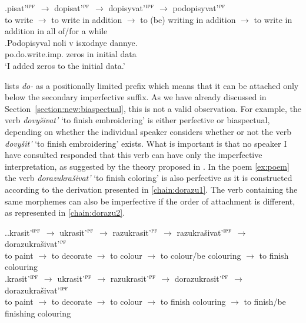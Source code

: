 \exg.\label{chain:podo}pisat'$^{\textsc{ipf}}$ $\rightarrow$ dopisat'$^{\textsc{pf}}$ $\rightarrow$ dopisyvat'$^{\textsc{ipf}}$ $\rightarrow$ podopisyvat'$^{\textsc{pf}}$\\
{to write} $\rightarrow$ {to write in addition} $\rightarrow$ {to (be) writing in addition} $\rightarrow$ {to write in addition in all of/for a while}\\

\exg.\label{ex:podopisyval}Podopisyval noli v isxodnye dannye.\\
po.do.write.imp. zeros in initial data\\
\trans `I added zeros to the initial data.'

\citet{Tatevosov:09} lists \textit{do-} as a positionally limited prefix which means that it can be attached only below the secondary imperfective suffix. As we have already discussed in Section~\ref{section:new:biaspectual}, this is not a valid observation. For example, the verb \textit{dovy\v{s}ivat'} `to finish embroidering' is either perfective or biaspectual, depending on whether the individual speaker considers whether or not the verb \textit{dovy\v{s}it'} `to finish embroidering' exists. What is important is that no speaker I have consulted responded that this verb can have only the imperfective interpretation, as suggested by the theory proposed in \citealt{Tatevosov:09}. In the poem \ref{ex:poem} the verb \textit{dorazukra\v{s}ivat'} `to finish coloring' is also perfective as it is constructed according to the derivation presented in \ref{chain:dorazu1}. The verb containing the same morphemes can also be imperfective if the order of attachment is different, as represented in \ref{chain:dorazu2}.

\ex.\ag.\label{chain:dorazu1}krasit'$^{\textsc{ipf}}$ $\rightarrow$ ukrasit'$^{\textsc{pf}}$ $\rightarrow$ razukrasit'$^{\textsc{pf}}$ $\rightarrow$ razukra\v{s}ivat'$^{\textsc{ipf}}$ $\rightarrow$ dorazukra\v{s}ivat'$^{\textsc{pf}}$\\
{to paint} $\rightarrow$ {to decorate} $\rightarrow$ {to colour} $\rightarrow$ {to colour/be colouring} $\rightarrow$ {to finish colouring}\\
\bg.\label{chain:dorazu2}krasit'$^{\textsc{ipf}}$ $\rightarrow$ ukrasit'$^{\textsc{pf}}$ $\rightarrow$ razukrasit'$^{\textsc{pf}}$ $\rightarrow$ dorazukrasit'$^{\textsc{pf}}$ $\rightarrow$ dorazukra\v{s}ivat'$^{\textsc{ipf}}$\\
{to paint} $\rightarrow$ {to decorate} $\rightarrow$ {to colour} $\rightarrow$ {to finish colouring} $\rightarrow$ {to finish/be finishing colouring}\\

